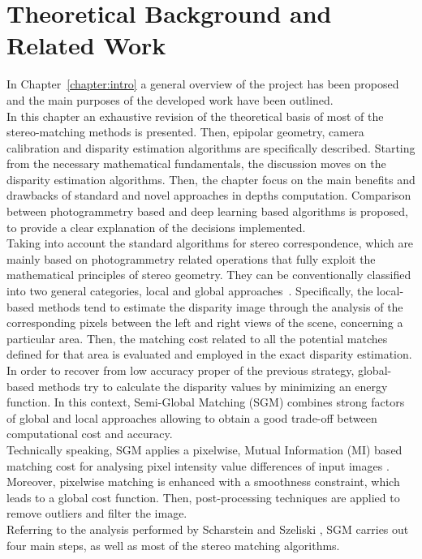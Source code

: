 \chapter{Theoretical Background and Related Work}
\label{chapter:background} 

In Chapter~\ref{chapter:intro} a general overview of the project has been proposed and the main purposes of the developed work have been outlined.\\
In this chapter an exhaustive revision of the theoretical basis of most of the stereo-matching methods is presented. 
Then, epipolar geometry, camera calibration and disparity estimation algorithms are specifically described. 
Starting from the necessary mathematical fundamentals, the discussion moves on the disparity estimation algorithms. 
Then, the chapter focus on the main benefits and drawbacks of standard and novel approaches in depths computation.
Comparison between photogrammetry based and deep learning based algorithms is proposed, to provide a clear explanation of the decisions implemented.\\
Taking into account the standard algorithms for stereo correspondence, which are mainly based on photogrammetry related operations that fully exploit the mathematical principles of stereo geometry.
They can be conventionally classified into two general categories, local and global approaches~\cite{Scharstein2001}.
Specifically, the local-based methods tend to estimate the disparity image through the analysis of the corresponding pixels between the left and right views of the scene, concerning a particular area. 
Then, the matching cost related to all the potential matches defined for that area is evaluated and employed in the exact disparity estimation.
In order to recover from low accuracy proper of the previous strategy, global-based methods try to calculate the disparity values by minimizing an energy function.
In this context, Semi-Global Matching (SGM) combines strong factors of global and local approaches allowing to obtain a good trade-off between computational cost and accuracy. \\
Technically speaking, SGM applies a pixelwise, Mutual Information (MI) based matching cost for analysing pixel intensity value differences of input images \cite{Hirschmuller2008}.
Moreover, pixelwise matching is enhanced with a smoothness constraint, which leads to a global cost function. 
Then, post-processing techniques are applied to remove outliers and filter the image.\\
Referring to the analysis performed by Scharstein and Szeliski \cite{Scharstein2001}, SGM carries out four main steps, as well as most of the stereo matching algorithms. 
